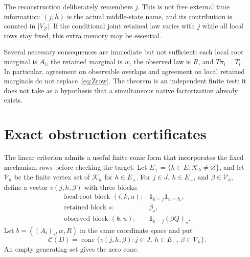 \documentclass[11pt]{article}
\newcommand{\cone}{\operatorname{cone}}
\newcommand{\Kcal}{\mathcal K}
\newcommand{\Ccal}{\mathcal C}
\theoremstyle{remark}
\begin{document}
The reconstruction deliberately remembers $j$. This is not free external time information: $(j,h)$ is the actual middle-state name, and its contribution is counted in $|V_Z|$. If the conditional joint retained law varies with $j$ while all local rows stay fixed, this extra memory may be essential.

Several necessary consequences are immediate but not sufficient: each local root marginal is $A_i$, the retained marginal is $w$, the observed law is $R$, and $T\pi_i=T_i$. In particular, agreement on observable overlaps and agreement on local retained marginals do not replace~\eqref{eq:Zrow}. The theorem is an independent finite test: it does not take as a hypothesis that a simultaneous native factorization already exists.

\section{Exact obstruction certificates}\label{sec:dual}

The linear criterion admits a useful finite conic form that incorporates the fixed mechanism rows before checking the target. Let $E_+=\{h\in E:\Kcal_h\ne\varnothing\}$, and let $\mathcal V_h$ be the finite vertex set of $\Kcal_h$ for $h\in E_+$. For $j\in J$, $h\in E_+$, and $\beta\in\mathcal V_h$, define a vector $v(j,h,\beta)$ with three blocks:
\[
 \begin{array}{ll}
 \text{local-root block }(i,k,u):&\mathbf1_{k=j}\mathbf1_{u=h_i},\\
 \text{retained block }s:&\beta_s,\\
 \text{observed block }(k,u):&\mathbf1_{k=j}(\beta Q)_u.
 \end{array}
\]
Let $b=((A_i)_i,w,R)$ in the same coordinate space and put
\begin{equation}\label{eq:cone}
 \Ccal(D)=\cone\{v(j,h,\beta):j\in J,\ h\in E_+,\ \beta\in\mathcal V_h\}.
\end{equation}
An empty generating set gives the zero cone.
\end{document}
